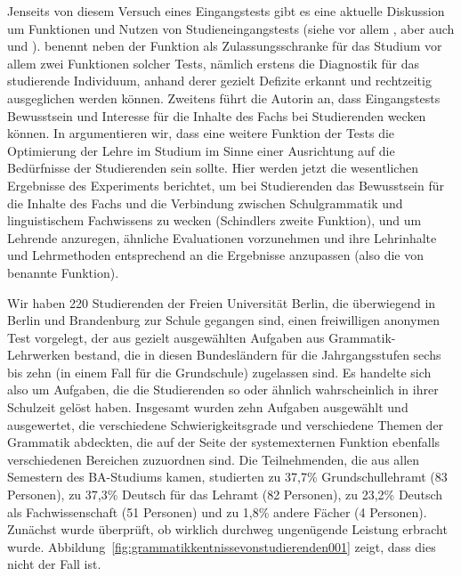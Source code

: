 Jenseits von diesem Versuch eines Eingangstests gibt es eine aktuelle Diskussion um Funktionen und Nutzen von Studieneingangstests (siehe vor allem \citealt{Schindler2016}, aber \zB auch \citealt{Bremerichvos2016} und \citealt{FuhrhopTeuber2016}).
\citet[16]{Schindler2016} benennt neben der Funktion als Zulassungsschranke für das Studium vor allem zwei Funktionen solcher Tests, nämlich erstens die Diagnostik für das studierende Individuum, anhand derer gezielt Defizite erkannt und rechtzeitig ausgeglichen werden können.
Zweitens führt die Autorin an, dass Eingangstests Bewusstsein und Interesse für die Inhalte des Fachs bei Studierenden wecken können.
In \citet[226]{SchaeferSayatz2017a} argumentieren wir, dass eine weitere Funktion der Tests die Optimierung der Lehre im Studium im Sinne einer Ausrichtung auf die Bedürfnisse der Studierenden sein sollte.
Hier werden jetzt die wesentlichen Ergebnisse des Experiments berichtet, um bei Studierenden das Bewusstsein für die Inhalte des Fachs und die Verbindung zwischen Schulgrammatik und linguistischem Fachwissens zu wecken (Schindlers zweite Funktion), und um Lehrende anzuregen, ähnliche Evaluationen vorzunehmen und ihre Lehrinhalte und Lehrmethoden entsprechend an die Ergebnisse anzupassen (also die von \citealt{SchaeferSayatz2017a} benannte Funktion).

Wir haben 220 Studierenden der Freien Universität Berlin, die überwiegend in Berlin und Brandenburg zur Schule gegangen sind, einen freiwilligen anonymen Test vorgelegt, der aus gezielt ausgewählten Aufgaben aus Grammatik-Lehrwerken bestand, die in diesen Bundesländern für die Jahrgangsstufen sechs bis zehn (in einem Fall für die Grundschule) zugelassen sind.
Es handelte sich also um Aufgaben, die die Studierenden so oder ähnlich wahrscheinlich in ihrer Schulzeit gelöst haben.
Insgesamt wurden zehn Aufgaben ausgewählt und ausgewertet, die verschiedene Schwierigkeitsgrade und verschiedene Themen der Grammatik abdeckten, die auf der Seite der systemexternen Funktion ebenfalls verschiedenen Bereichen zuzuordnen sind.
Die Teilnehmenden, die aus allen Semestern des BA-Studiums kamen, studierten zu 37,7\% Grundschullehramt (83 Personen), zu 37,3\% Deutsch für das Lehramt (82 Personen), zu 23,2\% Deutsch als Fachwissenschaft (51 Personen) und zu 1,8\% andere Fächer (4 Personen).
Zunächst wurde überprüft, ob wirklich durchweg ungenügende Leistung erbracht wurde.
Abbildung~\ref{fig:grammatikkentnissevonstudierenden001} zeigt, dass dies nicht der Fall ist.

